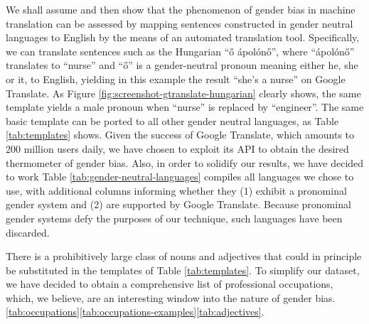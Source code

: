 \documentclass[fleqn,10pt]{article}
\begin{document}
We shall assume and then show that the phenomenon of gender bias in machine translation can be assessed by mapping sentences constructed in gender neutral languages to English by the means of an automated translation tool. Specifically, we can translate sentences such as the Hungarian ``ő ápolónő'', where ``ápolónő'' translates to ``nurse'' and ``ő'' is a gender-neutral pronoun meaning either he, she or it, to English, yielding in this example the result ``she's a nurse'' on Google Translate. As Figure \ref{fig:screenshot-gtranslate-hungarian} clearly shows, the same template yields a male pronoun when ``nurse'' is replaced by ``engineer''. The same basic template can be ported to all other gender neutral languages, as Table \ref{tab:templates} shows. Given the success of Google Translate, which amounts to 200 million users daily, we have chosen to exploit its API to obtain the desired thermometer of gender bias. Also, in order to solidify our results, we have decided to work \cite{wals} Table \ref{tab:gender-neutral-languages} compiles all languages we chose to use, with additional columns informing whether they
(1) exhibit a pronominal gender system and (2) are supported by Google Translate. Because pronominal gender systems defy the purposes of our technique, such languages have been discarded.

There is a prohibitively large class of nouns and adjectives that could in principle be substituted in the templates of Table \ref{tab:templates}. To simplify our dataset, we have decided to obtain a comprehensive list of professional occupations, which, we believe, are an interesting window into the nature of gender bias. \cite{BLS2017}\ref{tab:occupations}\ref{tab:occupations-examples}\ref{tab:adjectives}.
\end{document}
